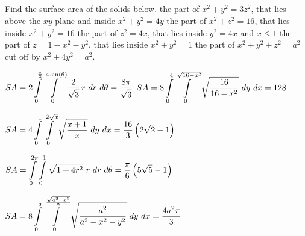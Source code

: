 \subsection*{}
\begin{Exercise} Find the surface area of the solids below.
    \Question[difficulty = 3] the part of $x^2+y^2 = 3z^2$, that lies above the $xy$-plane and inside $x^2+y^2=4y$
    \Question[difficulty = 2] the part of $x^2+z^2=16$, that lies inside $x^2+y^2=16$
    \Question[difficulty = 3] the part of $z^2=4x$, that lies inside $y^2=4x$ and $x \leq 1$
    \Question[difficulty = 2] the part of $z=1-x^2-y^2$, that lies inside $x^2+y^2=1$
    \Question[difficulty = 2] the part of $x^2+y^2+z^2= a^2$  cut off by $x^2+4y^2=a^2$.
\end{Exercise}

\begin{Answer}
    
    \Question $SA=2 \displaystyle \int\limits_0^{\frac{\pi}{2}} \int\limits_0^{4 \sin(\theta) } \dfrac{2}{\sqrt{3}} \, r \  dr \ d\theta = \dfrac{8 \pi}{\sqrt{3}}$
    \Question $SA=8 \displaystyle \int\limits_0^{4} \int\limits_0^{\sqrt{16-x^2}} \sqrt{\dfrac{16}{16-x^2}}  \  dy \ dx = 128 $
    
    \Question $SA=4 \displaystyle \int\limits_0^{1} \int\limits_0^{2\sqrt{x}} \sqrt{\dfrac{x+1}{x}}  \  dy \ dx = \dfrac{16}{3} \left(2 \sqrt{2}-1 \right) $
    
    \Question $SA= \displaystyle \int\limits_0^{2\pi} \int\limits_0^{1} \sqrt{1+4r^2} \ r \ dr \ d\theta = \dfrac{\pi}{6} \left(5\sqrt{5}-1 \right) $
    
    \Question $SA= 8 \displaystyle \int\limits_0^{a} \int\limits_0^{\frac{\sqrt{a^2 - x^2}}{2}} \sqrt{ \dfrac{a^2}{a^2-x^2-y^2}} \ dy \ dx = \dfrac{4a^2\pi}{3}$
    
    
\end{Answer}



\subsection*{}



